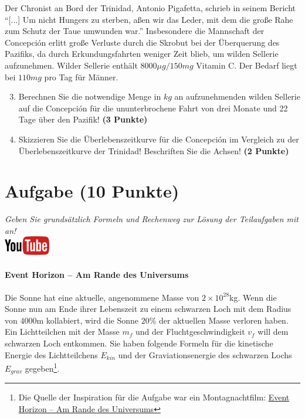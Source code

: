 \documentclass[a4paper, 9pt]{scrartcl}\usepackage[]{graphicx}\usepackage[]{xcolor}
\begin{document}
Der Chronist an Bord der Trinidad, Antonio Pigafetta, schrieb in seinem
Bericht "`[...] Um nicht Hungers zu sterben, a{\ss}en wir das Leder, mit dem
die gro{\ss}e Rahe zum Schutz der Taue umwunden war."' Insbesondere die
Mannschaft der Concepci{\'o}n erlitt gro{\ss}e Verluste durch die Skrobut bei der
{\"U}berquerung des Pazifiks, da durch Erkundungsfahrten weniger Zeit blieb, um
wilden Sellerie aufzunehmen. Wilder Sellerie enth{\"a}lt
$8000\mu g/150mg$ Vitamin C. Der Bedarf liegt bei
$110mg$ pro Tag f{\"u}r M{\"a}nner.

\begin{enumerate}
  \setcounter{enumi}{2}
\item Berechnen Sie die notwendige Menge in $kg$ an
  aufzunehmenden wilden Sellerie auf die Concepci{\'o}n f{\"u}r die ununterbrochene
  Fahrt von drei Monate und 22 Tage {\"u}ber den Pazifik!
  \textbf{(3 Punkte)}
\item Skizzieren Sie die {\"U}berlebenszeitkurve f{\"u}r die Concepci{\'o}n im
  Vergleich zu der {\"U}berlebenszeitkurve der Trinidad! Beschriften Sie die
  Achsen! \textbf{(2 Punkte)}
\end{enumerate}

 
\clearpage

\section{Aufgabe \hfill (10 Punkte)}

\textit{Geben Sie grunds{\"a}tzlich Formeln und Rechenweg zur L{\"o}sung der
  Teilaufgaben mit an!} \\[1Ex]

\hfill\href{https://youtu.be/q-qYK4Chslg}{\includegraphics[width =
  2cm]{img/youtube}} %
\hspace{2Ex}

\paragraph{Event Horizon -- Am Rande des Universums}



Die Sonne hat eine aktuelle, angenommene Masse von $\ensuremath{2\times 10^{28}}$kg. Wenn
die Sonne nun am Ende ihrer Lebenszeit zu einem schwarzen Loch mit dem
Radius von $4000$m kollabiert, wird die Sonne $20$\%
der aktuellen Masse verloren haben. Ein Lichtteilchen mit der Masse $m_f$
und der Fluchtgeschwindigkeit $v_f$ will dem schwarzen Loch entkommen.  Sie
haben folgende Formeln f{\"u}r die kinetische Energie des Lichtteilchens
$E_{kin}$ und der Graviationsenergie des schwarzen Lochs $E_{grav}$
gegeben\footnote{Die Quelle der Inspiration
  für die Aufgabe war ein Montagnachtfilm:
  \href{https://de.wikipedia.org/wiki/Event_Horizon_–_Am_Rande_des_Universums}{Event Horizon – Am Rande des Universums}}.
\end{document}
